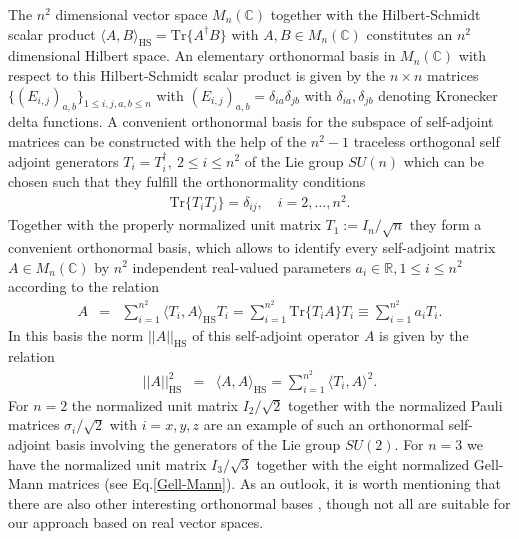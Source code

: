 \documentclass[12pt]{iopart}
\begin{document}
The $n^2$ dimensional vector space $M_n(\mathbb{C})$ together with the
Hilbert-Schmidt scalar product $\langle A,B\rangle_{\text{HS}}=\mathrm{Tr} \{A^\dagger B\}$ with $A,B \in M_n(\mathbb{C})$ constitutes an $n^2$ dimensional Hilbert space.  An elementary orthonormal basis in 
$M_n(\mathbb{C})$ with respect to this Hilbert-Schmidt scalar product is given by the $n \times n$ matrices $\{(E_{i,j})_{a,b}\}_{1 \leqslant i,j,a,b \leqslant n}$ with
$(E_{i,j})_{a,b}  = \delta_{ia}\delta_{jb}$ with $\delta_{ia},\delta_{jb}$ denoting Kronecker delta functions. A convenient orthonormal basis for the subspace of self-adjoint matrices can be constructed with 
the help of the $n^2-1$ traceless orthogonal self adjoint generators $T_i = T_i^{\dagger},~2\leq i \leq n^2$ of
 the Lie group $SU(n)$ which can be chosen such that they fulfill the orthonormality conditions\cite{Kimura}
\begin{eqnarray}
 \mathrm{Tr} \{T_iT_j\}= \delta_{ij}, \quad i=2,\dots, n^2. 
\end{eqnarray}
Together with the properly normalized unit matrix $T_1:= I_n/\sqrt{n}$ they form
a convenient orthonormal basis, which allows to identify every self-adjoint matrix $A \in M_n(\mathbb{C})$ by $n^2$ independent real-valued parameters $a_i \in \mathbb{R},1\leq i\leq n^2$ according 
to the relation \cite{Rudin}
\begin{eqnarray}
A &=&
\sum^{n^2}_{i=1} \langle T_i, A \rangle _{\text{HS}} T_i =
\sum_{i=1}^{n^2} \mathrm{Tr}\{T_i A\}T_i  \equiv \sum_{i=1}^{n^2}a_i T_i.
\label{repr}
\end{eqnarray}
In this basis the norm $||A||_{\text{HS}}$ of this self-adjoint operator $A$ is given by the relation
\begin{eqnarray}
 ||A||^2_{\text{HS}}&=&\langle A, A \rangle _{\text{HS}}=\sum^{n^2}_{i=1} \langle T_i, A \rangle^2.
\end{eqnarray}
For $n=2$ the normalized unit matrix  $I_2/\sqrt{2}$ together with the normalized Pauli matrices
$ \sigma_{i}/\sqrt{2}$ with $i=x,y,z$ are an example of such an orthonormal self-adjoint basis involving the generators of the Lie group $SU(2)$. For $n=3$ we have the normalized unit matrix $I_3/\sqrt{3}$ together with the eight normalized Gell-Mann matrices (see Eq.\eqref{Gell-Mann}).  
As an outlook, it is worth mentioning that there are also other interesting orthonormal bases \cite{Krammer}, 
though not all are suitable for our approach based on real vector spaces.
\end{document}

